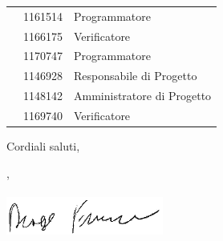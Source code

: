 \documentclass[12pt]{letter}
\begin{document}
\begin{letter}
{\begin{longtable}{ C{4cm} C{3cm} C{6cm} }
                \CE{} & 1161514 & Programmatore \\
                \SE{} & 1166175 & Verificatore \\
                \PF{} & 1170747 & Programmatore \\
                \DF{} & 1146928 & Responsabile di Progetto \\
                \BR{} & 1148142 & Amministratore di Progetto \\
                \AT{} & 1169740 & Verificatore \\  
            \end{longtable}
        }
        Cordiali saluti,
        \closing{\DF{}, \\ \textit{\Responsabile{}}\\ \includegraphics[width=.6\linewidth]{../DocumentazioneEsterna/PianoDiProgetto/sezioni/Firme/Francesco.png}}
        \vspace{10mm}
    \end{letter}
\end{document}
